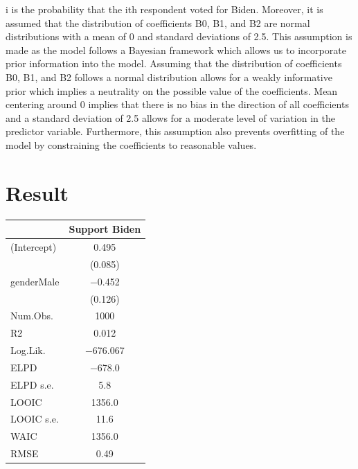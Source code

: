 \documentclass[
  letterpaper,
  DIV=11,
  numbers=noendperiod]{scrartcl}
\begin{document}
i is the probability that the ith respondent voted for Biden. Moreover,
it is assumed that the distribution of coefficients B0, B1, and B2 are
normal distributions with a mean of 0 and standard deviations of 2.5.
This assumption is made as the model follows a Bayesian framework which
allows us to incorporate prior information into the model. Assuming that
the distribution of coefficients B0, B1, and B2 follows a normal
distribution allows for a weakly informative prior which implies a
neutrality on the possible value of the coefficients. Mean centering
around 0 implies that there is no bias in the direction of all
coefficients and a standard deviation of 2.5 allows for a moderate level
of variation in the predictor variable. Furthermore, this assumption
also prevents overfitting of the model by constraining the coefficients
to reasonable values.

\hypertarget{result}{%
\section{Result}\label{result}}

\begin{table}
\centering
\begin{tabular}[t]{lc}
\toprule
  & Support Biden\\
\midrule
(Intercept) & \num{0.495}\\
 & (\num{0.085})\\
genderMale & \num{-0.452}\\
 & (\num{0.126})\\
\midrule
Num.Obs. & \num{1000}\\
R2 & \num{0.012}\\
Log.Lik. & \num{-676.067}\\
ELPD & \num{-678.0}\\
ELPD s.e. & \num{5.8}\\
LOOIC & \num{1356.0}\\
LOOIC s.e. & \num{11.6}\\
WAIC & \num{1356.0}\\
RMSE & \num{0.49}\\
\bottomrule
\end{tabular}
\end{table}
\end{document}
